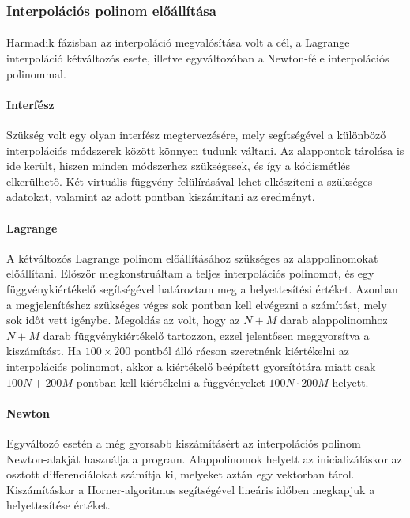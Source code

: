 \documentclass[12pt]{report}
\begin{document}
\subsubsection{Interpolációs polinom előállítása}
\paragraph{}
Harmadik fázisban az interpoláció megvalósítása volt a cél, a Lagrange interpoláció kétváltozós esete, illetve egyváltozóban a Newton-féle interpolációs polinommal.

\paragraph{Interfész}
Szükség volt egy olyan interfész megtervezésére, mely segítségével a különböző interpolációs módszerek között könnyen tudunk váltani. Az alappontok tárolása is ide került, hiszen minden módszerhez szükségesek, és így a kódismétlés elkerülhető. Két virtuális függvény felülírásával lehet elkészíteni a szükséges adatokat, valamint az adott pontban kiszámítani az eredményt.

\paragraph{Lagrange}
A kétváltozós Lagrange polinom előállításához szükséges az alappolinomokat előállítani. Először megkonstruáltam a teljes interpolációs polinomot, és egy függvénykiértékelő segítségével határoztam meg a helyettesítési értéket. Azonban a megjelenítéshez szükséges véges sok pontban kell elvégezni a számítást, mely sok időt vett igénybe. Megoldás az volt, hogy az $N+M$ darab alappolinomhoz $N+M$ darab függvénykiértékelő tartozzon, ezzel jelentősen meggyorsítva a kiszámítást. Ha $100 \times 200$ pontból álló rácson szeretnénk kiértékelni az interpolációs polinomot, akkor a kiértékelő beépített gyorsítótára miatt csak $100 N+200 M$ pontban kell kiértékelni a függvényeket $100 N \cdot 200 M$ helyett.

\paragraph{Newton}
Egyváltozó esetén a még gyorsabb kiszámításért az interpolációs polinom Newton-alakját használja a program. Alappolinomok helyett az inicializáláskor az osztott differenciálokat számítja ki, melyeket aztán egy vektorban tárol. Kiszámításkor a Horner-algoritmus segítségével lineáris időben megkapjuk a helyettesítése értéket.
 
\end{document}
